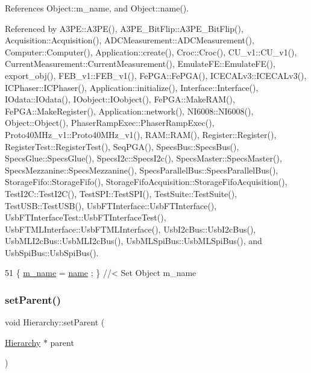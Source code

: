 References Object\+::m\+\_\+name, and Object\+::name().



Referenced by A3\+P\+E\+::\+A3\+P\+E(), A3\+P\+E\+\_\+\+Bit\+Flip\+::\+A3\+P\+E\+\_\+\+Bit\+Flip(), Acquisition\+::\+Acquisition(), A\+D\+C\+Measurement\+::\+A\+D\+C\+Measurement(), Computer\+::\+Computer(), Application\+::create(), Croc\+::\+Croc(), C\+U\+\_\+v1\+::\+C\+U\+\_\+v1(), Current\+Measurement\+::\+Current\+Measurement(), Emulate\+F\+E\+::\+Emulate\+F\+E(), export\+\_\+obj(), F\+E\+B\+\_\+v1\+::\+F\+E\+B\+\_\+v1(), Fe\+P\+G\+A\+::\+Fe\+P\+G\+A(), I\+C\+E\+C\+A\+Lv3\+::\+I\+C\+E\+C\+A\+Lv3(), I\+C\+Phaser\+::\+I\+C\+Phaser(), Application\+::initialize(), Interface\+::\+Interface(), I\+Odata\+::\+I\+Odata(), I\+Oobject\+::\+I\+Oobject(), Fe\+P\+G\+A\+::\+Make\+R\+A\+M(), Fe\+P\+G\+A\+::\+Make\+Register(), Application\+::network(), N\+I6008\+::\+N\+I6008(), Object\+::\+Object(), Phaser\+Ramp\+Exec\+::\+Phaser\+Ramp\+Exec(), Proto40\+M\+Hz\+\_\+v1\+::\+Proto40\+M\+Hz\+\_\+v1(), R\+A\+M\+::\+R\+A\+M(), Register\+::\+Register(), Register\+Test\+::\+Register\+Test(), Seq\+P\+G\+A(), Specs\+Bus\+::\+Specs\+Bus(), Specs\+Glue\+::\+Specs\+Glue(), Specs\+I2c\+::\+Specs\+I2c(), Specs\+Master\+::\+Specs\+Master(), Specs\+Mezzanine\+::\+Specs\+Mezzanine(), Specs\+Parallel\+Bus\+::\+Specs\+Parallel\+Bus(), Storage\+Fifo\+::\+Storage\+Fifo(), Storage\+Fifo\+Acquisition\+::\+Storage\+Fifo\+Acquisition(), Test\+I2\+C\+::\+Test\+I2\+C(), Test\+S\+P\+I\+::\+Test\+S\+P\+I(), Test\+Suite\+::\+Test\+Suite(), Test\+U\+S\+B\+::\+Test\+U\+S\+B(), Usb\+F\+T\+Interface\+::\+Usb\+F\+T\+Interface(), Usb\+F\+T\+Interface\+Test\+::\+Usb\+F\+T\+Interface\+Test(), Usb\+F\+T\+M\+L\+Interface\+::\+Usb\+F\+T\+M\+L\+Interface(), Usb\+I2c\+Bus\+::\+Usb\+I2c\+Bus(), Usb\+M\+L\+I2c\+Bus\+::\+Usb\+M\+L\+I2c\+Bus(), Usb\+M\+L\+Spi\+Bus\+::\+Usb\+M\+L\+Spi\+Bus(), and Usb\+Spi\+Bus\+::\+Usb\+Spi\+Bus().


\begin{DoxyCode}
51 \{ \hyperlink{classObject_a8b83c95c705d2c3ba0d081fe1710f48d}{m\_name}  = \hyperlink{classObject_a300f4c05dd468c7bb8b3c968868443c1}{name}  ; \} \textcolor{comment}{//< Set Object m\_name}
\end{DoxyCode}
\mbox{\label{classHierarchy_a585ad1aeec16077a0e532ab8b4fc557b}} 
\subsubsection{\texorpdfstring{set\+Parent()}{setParent()}}
{\footnotesize\ttfamily void Hierarchy\+::set\+Parent (\begin{DoxyParamCaption}\item[{\hyperlink{classHierarchy}{Hierarchy} $\ast$}]{parent }\end{DoxyParamCaption})\hspace{0.3cm}{\ttfamily [inherited]}}



